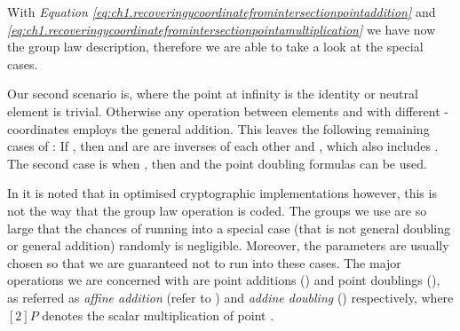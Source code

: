 With \textit{Equation \ref{eq:ch1.recoveringycoordinatefromintersectionpointaddition}} and \textit{\ref{eq:ch1.recoveringycoordinatefromintersectionpointamultiplication}} we have now the group law description, therefore we are able to take a look at the special cases. 

Our second scenario is, where the point at infinity is the identity or neutral element is trivial.  Otherwise any operation between elements  and  with different -coordinates employs the general addition. This leaves the following remaining cases of  : If , then  and  are are inverses of each other and , which also includes . The second case is when , then  and the point doubling formulas can be used.



In \cite{theory.pairings.for.beginners} it is noted that in optimised cryptographic implementations however, this is not the way that the group law operation is coded. The groups we use are so large that the chances of running into a special case (that is not general doubling or general addition) randomly is negligible. Moreover, the parameters are usually chosen so that we are guaranteed not to run into these cases. The major operations we are concerned with are point additions ()
and point doublings (), as referred as \textit{affine addition} (refer to ) and \textit{addine doubling} () respectively, where $[2]P$ denotes the scalar multiplication of point .


